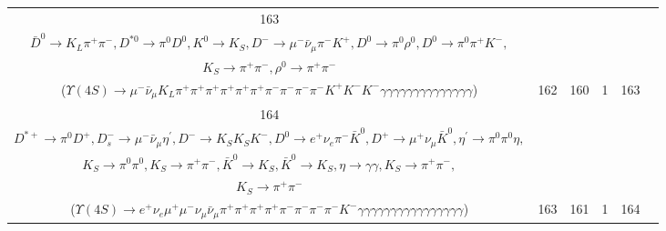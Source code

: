 \documentclass[landscape]{article}
\begin{document}
\begin{table}[htbp!]
\begin{tabular}{|c|c|c|c|c|c|}
\hline
163 & \makecell{ $ 
\Upsilon(4S) \rightarrow B^{0} \bar{B}^{0} ,
B^{0} \rightarrow K^{*+} \bar{D}^{*-} D^{*0} ,
\bar{B}^{0} \rightarrow \pi^{0} \pi^{0} \pi^{+} K^{-} \bar{D}^{0} D^{*0} ,
K^{*+} \rightarrow \pi^{+} K^{0} ,
\bar{D}^{*-} \rightarrow \pi^{0} D^{-} ,
D^{*0} \rightarrow \pi^{0} D^{0} ,
$ \\ $
\bar{D}^{0} \rightarrow K_{L} \pi^{+} \pi^{-} ,
D^{*0} \rightarrow \pi^{0} D^{0} ,
K^{0} \rightarrow K_{S} ,
D^{-} \rightarrow \mu^{-} \bar{\nu}_{\mu} \pi^{-} K^{+} ,
D^{0} \rightarrow \pi^{0} \rho^{0} ,
D^{0} \rightarrow \pi^{0} \pi^{+} K^{-} ,
$ \\ $
K_{S} \rightarrow \pi^{+} \pi^{-} ,
\rho^{0} \rightarrow \pi^{+} \pi^{-} 
$ \\ ($
\Upsilon(4S) \rightarrow \mu^{-} \bar{\nu}_{\mu} K_{L} \pi^{+} \pi^{+} \pi^{+} \pi^{+} \pi^{+} \pi^{+} \pi^{-} \pi^{-} \pi^{-} \pi^{-} K^{+} K^{-} K^{-} \gamma \gamma \gamma \gamma \gamma \gamma \gamma \gamma \gamma \gamma \gamma \gamma \gamma \gamma 
$) } & 162 & 160 & 1 & 163 \\
\hline
164 & \makecell{ $ 
\Upsilon(4S) \rightarrow B^{0} \bar{B}^{0} ,
B^{0} \rightarrow \pi^{+} \bar{D}^{*-} D^{*0} ,
\bar{B}^{0} \rightarrow \eta D^{*+} D_{s}^{-} ,
\bar{D}^{*-} \rightarrow D^{-} \gamma ,
D^{*0} \rightarrow D^{0} \gamma ,
\eta \rightarrow \gamma \gamma ,
$ \\ $
D^{*+} \rightarrow \pi^{0} D^{+} ,
D_{s}^{-} \rightarrow \mu^{-} \bar{\nu}_{\mu} \eta^{\prime} ,
D^{-} \rightarrow K_{S} K_{S} K^{-} ,
D^{0} \rightarrow e^{+} \nu_{e} \pi^{-} \bar{K}^{0} ,
D^{+} \rightarrow \mu^{+} \nu_{\mu} \bar{K}^{0} ,
\eta^{\prime} \rightarrow \pi^{0} \pi^{0} \eta ,
$ \\ $
K_{S} \rightarrow \pi^{0} \pi^{0} ,
K_{S} \rightarrow \pi^{+} \pi^{-} ,
\bar{K}^{0} \rightarrow K_{S} ,
\bar{K}^{0} \rightarrow K_{S} ,
\eta \rightarrow \gamma \gamma ,
K_{S} \rightarrow \pi^{+} \pi^{-} ,
$ \\ $
K_{S} \rightarrow \pi^{+} \pi^{-} 
$ \\ ($
\Upsilon(4S) \rightarrow e^{+} \nu_{e} \mu^{+} \mu^{-} \nu_{\mu} \bar{\nu}_{\mu} \pi^{+} \pi^{+} \pi^{+} \pi^{+} \pi^{-} \pi^{-} \pi^{-} \pi^{-} K^{-} \gamma \gamma \gamma \gamma \gamma \gamma \gamma \gamma \gamma \gamma \gamma \gamma \gamma \gamma \gamma \gamma 
$) } & 163 & 161 & 1 & 164 \\
\hline
\end{tabular}
\end{table}

\clearpage
\end{document}
